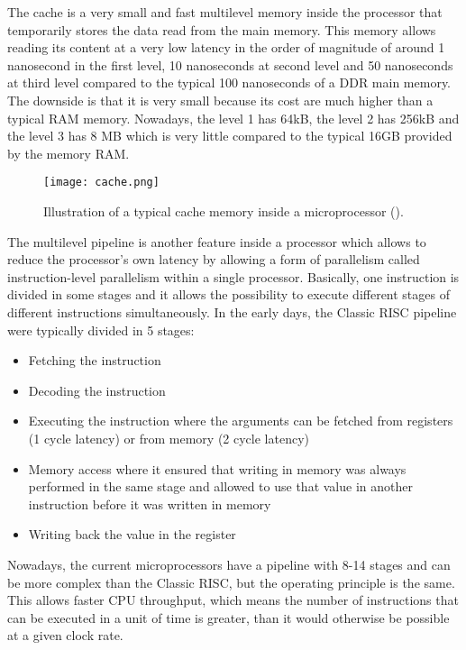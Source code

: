 \par
The cache is a very small and fast multilevel memory inside the processor that temporarily stores the data read from the main memory.
This memory allows reading its content at a very low latency in the order of magnitude of around 1 nanosecond in the first level, 10 nanoseconds at second level and 50 nanoseconds at third level compared to the typical 100 nanoseconds of a DDR main memory.
The downside is that it is very small because its cost are much higher than a typical RAM memory.
Nowadays, the level 1 has 64kB, the level 2 has 256kB and the level 3 has 8 MB which is very little compared to the typical 16GB provided by the memory RAM.

\begin{figure}[H]
	\centering
	\caption{Illustration of a typical cache memory inside a microprocessor (\cite{CPU_Cache}).}
	\label{Cache.}
	\texttt{[image: cache.png]}
\end{figure}

\par
The multilevel pipeline is another feature inside a processor which allows to reduce the processor's own latency by allowing a form of parallelism called instruction-level parallelism within a single processor.
Basically, one instruction is divided in some stages and it allows the possibility to execute different stages of different instructions simultaneously.
In the early days, the Classic RISC pipeline were typically divided in 5 stages:
\begin{itemize}  
	\item Fetching the instruction
	\item Decoding the instruction
	\item Executing the instruction where the arguments can be fetched from registers (1 cycle latency) or from memory (2 cycle latency)
	\item Memory access where it ensured that writing in memory was always performed in the same stage and allowed to use that value in another instruction before it was written in memory
	\item Writing back the value in the register
\end{itemize}
Nowadays, the current microprocessors have a pipeline with 8-14 stages and can be more complex than the Classic RISC, but the operating principle is the same.
This allows faster CPU throughput, which means the number of instructions that can be executed in a unit of time is greater, than it would otherwise be possible at a given clock rate.

